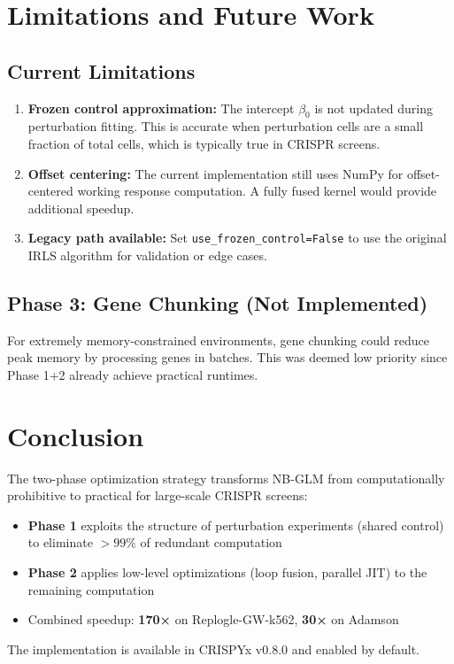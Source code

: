 \documentclass{article}
\begin{document}
\section{Limitations and Future Work}

\subsection{Current Limitations}

\begin{enumerate}
    \item \textbf{Frozen control approximation:} The intercept $\beta_0$ is not updated during perturbation fitting. This is accurate when perturbation cells are a small fraction of total cells, which is typically true in CRISPR screens.
    
    \item \textbf{Offset centering:} The current implementation still uses NumPy for offset-centered working response computation. A fully fused kernel would provide additional speedup.
    
    \item \textbf{Legacy path available:} Set \texttt{use\_frozen\_control=False} to use the original IRLS algorithm for validation or edge cases.
\end{enumerate}

\subsection{Phase 3: Gene Chunking (Not Implemented)}

For extremely memory-constrained environments, gene chunking could reduce peak memory by processing genes in batches. This was deemed low priority since Phase 1+2 already achieve practical runtimes.

\section{Conclusion}

The two-phase optimization strategy transforms NB-GLM from computationally prohibitive to practical for large-scale CRISPR screens:

\begin{itemize}
    \item \textbf{Phase 1} exploits the structure of perturbation experiments (shared control) to eliminate $>99\%$ of redundant computation
    \item \textbf{Phase 2} applies low-level optimizations (loop fusion, parallel JIT) to the remaining computation
    \item Combined speedup: \textbf{170×} on Replogle-GW-k562, \textbf{30×} on Adamson
\end{itemize}

The implementation is available in CRISPYx v0.8.0 and enabled by default.
\end{document}
